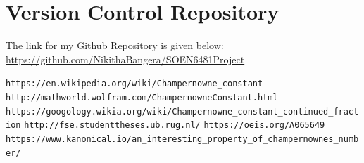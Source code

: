 \documentclass[12pt, a4paper]{report}
\begin{document}
\chapter{Version Control Repository}
The link for my Github Repository is given below:\\
\url{https://github.com/NikithaBangera/SOEN6481Project}

\begin{thebibliography}{9}
    \texttt{https://en.wikipedia.org/wiki/Champernowne{\_}constant}
    \texttt{http://mathworld.wolfram.com/ChampernowneConstant.html}
    \texttt{https://googology.wikia.org/wiki/Champernowne{\_}constant{\_}continued{\_}fraction}
    \texttt{http://fse.studenttheses.ub.rug.nl/}
    \texttt{https://oeis.org/A065649}
    \texttt{https://www.kanonical.io/an{\_}interesting{\_}property{\_}of{\_}champernownes{\_}number/}
\end{thebibliography}
\end{document}
